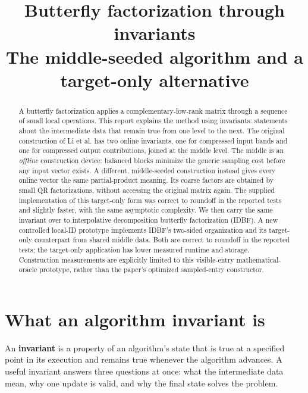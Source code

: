\documentclass[11pt]{article}
\title{\textbf{Butterfly factorization through invariants}\\[0.3em]
\large The middle-seeded algorithm and a target-only alternative}
\author{}
\date{}
\begin{document}
\maketitle

\begin{abstract}
A butterfly factorization applies a complementary-low-rank matrix through a sequence of small local operations.  This report explains the method using invariants: statements about the intermediate data that remain true from one level to the next.  The original construction of Li et al. has two online invariants, one for compressed input bands and one for compressed output contributions, joined at the middle level.  The middle is an \emph{offline} construction device: balanced blocks minimize the generic sampling cost before any input vector exists.  A different, middle-seeded construction instead gives every online vector the same partial-product meaning.  Its coarse factors are obtained by small QR factorizations, without accessing the original matrix again.  The supplied implementation of this target-only form was correct to roundoff in the reported tests and slightly faster, with the same asymptotic complexity.  We then carry the same invariant over to interpolative decomposition butterfly factorization (IDBF).  A new controlled local-ID prototype implements IDBF's two-sided organization and its target-only counterpart from shared middle data.  Both are correct to roundoff in the reported tests; the target-only application has lower measured runtime and storage.  Construction measurements are explicitly limited to this visible-entry mathematical-oracle prototype, rather than the paper's optimized sampled-entry constructor.
\end{abstract}

\tableofcontents

\section{What an algorithm invariant is}

An \textbf{invariant} is a property of an algorithm's state that is true at a specified point in its execution and remains true whenever the algorithm advances.  A useful invariant answers three questions at once: what the intermediate data mean, why one update is valid, and why the final state solves the problem.
\end{document}
